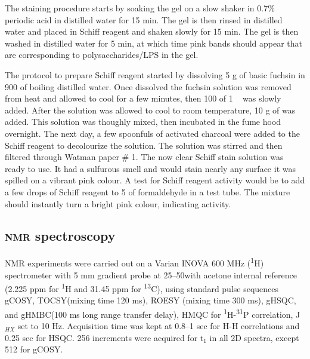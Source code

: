     The staining procedure starts by soaking the gel on a slow shaker in 0.7\% periodic acid in
    distilled water for 15 min. The gel is then rinsed in distilled water and placed in Schiff reagent
    and shaken slowly for 15 min. The gel is then washed in distilled water for 5 min, at which time
    pink bands should appear that are corresponding to polysaccharides/\ac{LPS} in the gel.

    The protocol to prepare Schiff reagent started by dissolving 5 \si{\gram} of basic fuchsin in
    900 \millilitre of boiling distilled water. Once dissolved the fuchsin solution was removed from
    heat and allowed to cool for a few minutes, then 100 \millilitre of 1 \si{\molar}\  was
    slowly added. After the solution was allowed to cool to room temperature, 10 \si{\gram} of
     was added. This solution was thoughly mixed, then incubated in the fume hood
    overnight. The next day, a few spoonfuls of activated charcoal were added to the Schiff reagent to
    decolourize the solution. The solution was stirred and then filtered through Watman paper \# 1. The
    now clear Schiff stain solution was ready to use. It had a sulfurous smell and would stain nearly
    any surface it was spilled on a vibrant pink colour. A test for Schiff reagent activity would be
    to add a few drops of Schiff reagent to 5 \millilitre of formaldehyde in a test tube. The mixture
    should instantly turn a bright pink colour, indicating activity.

    \subsection{\textsc{nmr} spectroscopy} %
    \label{sub:nmr_spectroscopy}

    \Ac{NMR} experiments were carried out on a Varian INOVA 600 \si{\mega\hertz}
    (\textsuperscript{1}H) spectrometer with 5 \si{\milli\meter} gradient probe at 25--50\cel with
acetone internal reference (2.225 ppm for \textsuperscript{1}H and 31.45 ppm for
\textsuperscript{13}C), using standard pulse sequences \ac{gCOSY}, \ac{TOCSY}(mixing time 120
\si{\milli\second}), \ac{ROESY} (mixing time 300 \si{\milli\second}), \ac{gHSQC}, and
\ac{gHMBC}(100 \si{\milli\second} long range transfer delay), \ac{HMQC} for
\textsuperscript{1}H-\textsuperscript{31}P correlation, J$_{HX}$ set to 10
\si{\hertz}. Acquisition time was kept at 0.8--1 sec for H-H correlations and 0.25 sec for
\ac{HSQC}. 256 increments were acquired for t$_1$ in all 2D spectra, except 512 for \ac{gCOSY}.

